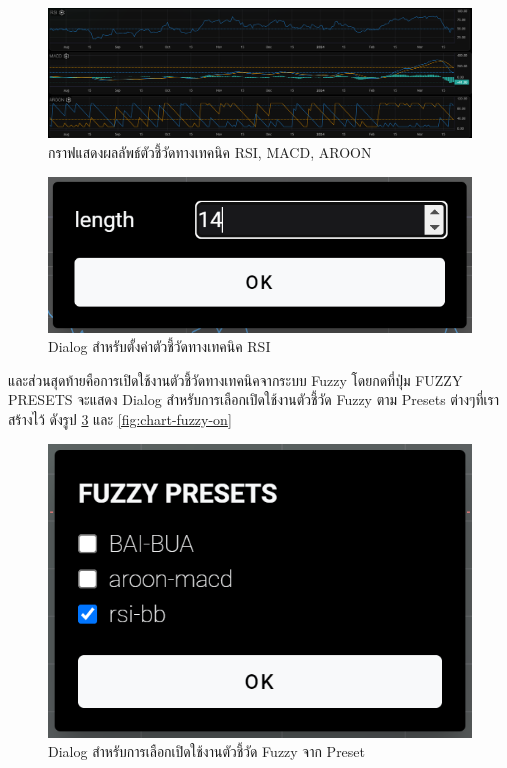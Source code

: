 \begin{figure}[ht]
    \centering
    \includegraphics[width=\textwidth]{images/web-tuts/chart-indicator-on.PNG}
    \caption{กราฟแสดงผลลัพธ์ตัวชี้วัดทางเทคนิค RSI, MACD, AROON}
    \label{fig:chart-indicator-on}
\end{figure}
\begin{figure}[ht]
    \centering
    \includegraphics[scale=0.5]{images/web-tuts/chart-indicator-setting.PNG}
    \caption{Dialog สำหรับตั้งค่าตัวชี้วัดทางเทคนิค RSI}
    \label{fig:chart-indicator-setting}
\end{figure}
\FloatBarrier
และส่วนสุดท้ายคือการเปิดใช้งานตัวชี้วัดทางเทคนิคจากระบบ Fuzzy โดยกดที่ปุ่ม FUZZY PRESETS จะแสดง Dialog สำหรับการเลือกเปิดใช้งานตัวชี้วัด Fuzzy ตาม Presets ต่างๆที่เราสร้างไว้ ดังรูป \ref{fig:chart-fuzzypreset-selector} และ \ref{fig:chart-fuzzy-on}
\begin{figure}[ht]
    \centering
    \includegraphics[scale=0.5]{images/web-tuts/chart-fuzzypreset-selector.PNG}
    \caption{Dialog สำหรับการเลือกเปิดใช้งานตัวชี้วัด Fuzzy จาก Preset}
    \label{fig:chart-fuzzypreset-selector}
\end{figure}
